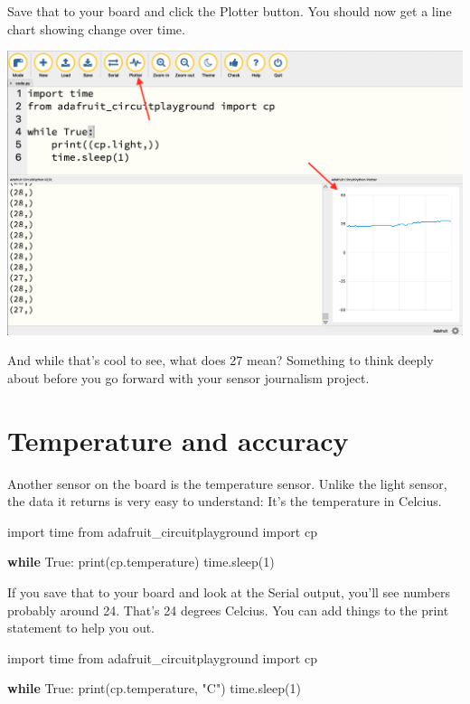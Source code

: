 \documentclass[
]{book}
\newenvironment{Shaded}{\begin{snugshade}}{\end{snugshade}}
\newcommand{\BuiltInTok}[1]{#1}
\newcommand{\ControlFlowTok}[1]{\textcolor[rgb]{0.13,0.29,0.53}{\textbf{#1}}}
\newcommand{\DecValTok}[1]{\textcolor[rgb]{0.00,0.00,0.81}{#1}}
\newcommand{\ImportTok}[1]{#1}
\newcommand{\NormalTok}[1]{#1}
\newcommand{\StringTok}[1]{\textcolor[rgb]{0.31,0.60,0.02}{#1}}
\newcommand{\VariableTok}[1]{\textcolor[rgb]{0.00,0.00,0.00}{#1}}
\begin{document}
Save that to your board and click the Plotter button. You should now get a line chart showing change over time.

\includegraphics[width=1\linewidth]{images/04image3}

And while that's cool to see, what does 27 mean? Something to think deeply about before you go forward with your sensor journalism project.

\hypertarget{temperature-and-accuracy}{%
\chapter{Temperature and accuracy}\label{temperature-and-accuracy}}

Another sensor on the board is the temperature sensor. Unlike the light sensor, the data it returns is very easy to understand: It's the temperature in Celcius.

\begin{Shaded}
\begin{Highlighting}[]
\ImportTok{import}\NormalTok{ time}
\ImportTok{from}\NormalTok{ adafruit_circuitplayground }\ImportTok{import}\NormalTok{ cp}
 
\ControlFlowTok{while} \VariableTok{True}\NormalTok{:}
    \BuiltInTok{print}\NormalTok{(cp.temperature)}
\NormalTok{    time.sleep(}\DecValTok{1}\NormalTok{)}
\end{Highlighting}
\end{Shaded}

If you save that to your board and look at the Serial output, you'll see numbers probably around 24. That's 24 degrees Celcius. You can add things to the print statement to help you out.

\begin{Shaded}
\begin{Highlighting}[]
\ImportTok{import}\NormalTok{ time}
\ImportTok{from}\NormalTok{ adafruit_circuitplayground }\ImportTok{import}\NormalTok{ cp}
 
\ControlFlowTok{while} \VariableTok{True}\NormalTok{:}
    \BuiltInTok{print}\NormalTok{(cp.temperature, }\StringTok{"C"}\NormalTok{)}
\NormalTok{    time.sleep(}\DecValTok{1}\NormalTok{)}
\end{Highlighting}
\end{Shaded}
\end{document}
